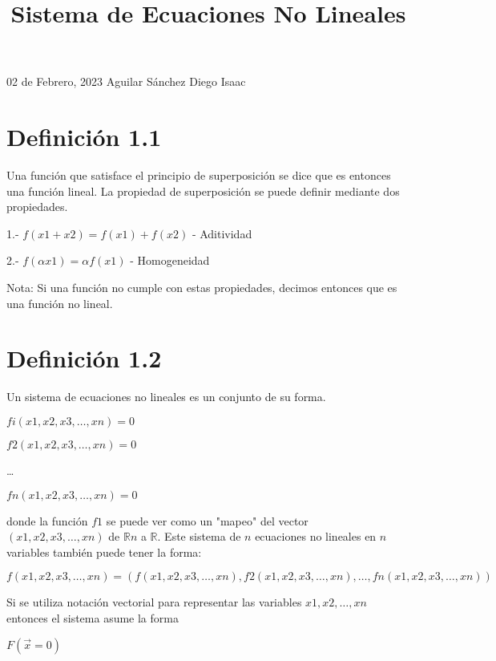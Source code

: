 \documentclass[12pt]{article}
\begin{document}
    \begin{flushright}
        02 de Febrero, 2023 \linebreak
        Aguilar Sánchez Diego Isaac
    \end{flushright}
    \title{Sistema de Ecuaciones No Lineales}
    \section*{Definición 1.1}
    Una función que satisface el principio de superposición se dice que es entonces una función lineal. La propiedad de superposición se puede definir mediante dos propiedades.
    \begin{center}
        1.- {$f(x1 + x2) = f(x1) + f(x2)$} - Aditividad
    \end{center}
    \begin{center}
        2.- {$f(\alpha x1) = \alpha f(x1)$} - Homogeneidad
    \end{center}
    \small{Nota: Si una función no cumple con estas propiedades, decimos entonces que es una función no lineal.}
    \section*{Definición 1.2}
    Un sistema de ecuaciones no lineales es un conjunto de su forma.
    \begin{center}
        $fi(x1, x2, x3, \dots, xn) = 0$
    \end{center}
    \begin{center}
        $f2(x1, x2, x3, \dots, xn) = 0$
    \end{center}
    \begin{center}
        \dots
    \end{center}
    \begin{center}
        $fn(x1, x2, x3, \dots, xn) = 0$
    \end{center}
    donde la función $f1$ se puede ver como un "mapeo" del vector $(x1, x2, x3, \dots, xn)$ de $\mathbb{R}n$ a $\mathbb{R}$.  Este sistema de $n$ ecuaciones no lineales en $n$ variables también puede tener la forma:
    \begin{center}
        $f(x1, x2, x3, \dots, xn)
        =(f(x1, x2, x3, \dots, xn), f2(x1, x2, x3, \dots, xn),\dots, fn(x1, x2, x3, \dots, xn))$

    \end{center} 
    Si se utiliza notación vectorial para representar las variables $x1, x2, \dots, xn$ entonces el sistema asume la forma 
    \begin{center}
        $F(\overrightarrow{x} = 0 )$
    \end{center}
\end{document}
